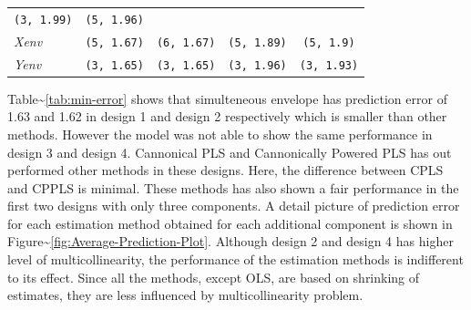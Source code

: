\documentclass[12pt,A4paper,authoryear]{elsarticle} %
\theoremstyle{definition}
\theoremstyle{definition}
\theoremstyle{remark}
\begin{document}
\begin{longtable}[]{@{}lcccc@{}}
\begin{minipage}[t]{0.19\columnwidth}
\texttt{(3,\ 1.99)}\strut
\end{minipage} & \begin{minipage}[t]{0.19\columnwidth}\centering\strut
\texttt{(5,\ 1.96)}\strut
\end{minipage}\tabularnewline
\begin{minipage}[t]{0.09\columnwidth}\raggedright\strut
\emph{Xenv}\strut
\end{minipage} & \begin{minipage}[t]{0.19\columnwidth}\centering\strut
\texttt{(5,\ 1.67)}\strut
\end{minipage} & \begin{minipage}[t]{0.19\columnwidth}\centering\strut
\texttt{(6,\ 1.67)}\strut
\end{minipage} & \begin{minipage}[t]{0.19\columnwidth}\centering\strut
\texttt{(5,\ 1.89)}\strut
\end{minipage} & \begin{minipage}[t]{0.19\columnwidth}\centering\strut
\texttt{(5,\ 1.9)}\strut
\end{minipage}\tabularnewline
\begin{minipage}[t]{0.09\columnwidth}\raggedright\strut
\emph{Yenv}\strut
\end{minipage} & \begin{minipage}[t]{0.19\columnwidth}\centering\strut
\texttt{(3,\ 1.65)}\strut
\end{minipage} & \begin{minipage}[t]{0.19\columnwidth}\centering\strut
\texttt{(3,\ 1.65)}\strut
\end{minipage} & \begin{minipage}[t]{0.19\columnwidth}\centering\strut
\texttt{(3,\ 1.96)}\strut
\end{minipage} & \begin{minipage}[t]{0.19\columnwidth}\centering\strut
\texttt{(3,\ 1.93)}\strut
\end{minipage}\tabularnewline
\bottomrule
\end{longtable}

Table\textasciitilde{}\ref{tab:min-error} shows that simulteneous
envelope has prediction error of 1.63 and 1.62 in design 1 and design 2
respectively which is smaller than other methods. However the model was
not able to show the same performance in design 3 and design 4.
Cannonical PLS and Cannonically Powered PLS has out performed other
methods in these designs. Here, the difference between CPLS and CPPLS is
minimal. These methods has also shown a fair performance in the first
two designs with only three components. A detail picture of prediction
error for each estimation method obtained for each additional component
is shown in Figure\textasciitilde{}\ref{fig:Average-Prediction-Plot}.
Although design 2 and design 4 has higher level of multicollinearity,
the performance of the estimation methods is indifferent to its effect.
Since all the methods, except OLS, are based on shrinking of estimates,
they are less influenced by multicollinearity problem.
\end{document}
